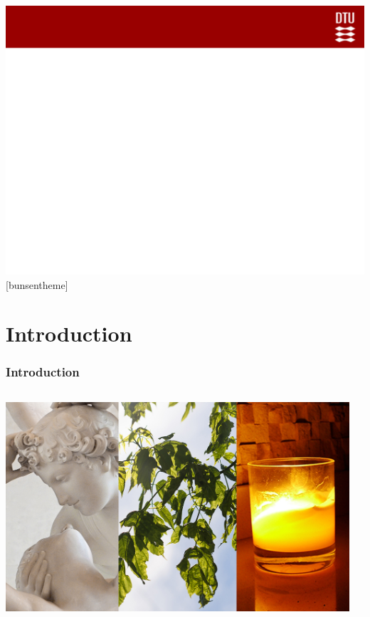 \documentclass{beamer}
\begin{document}
 {\includegraphics[width=\paperwidth,height=\paperheight]{slide_bg}}
[bunsentheme]

\section{Introduction}

\begin{frame}
    \frametitle{Introduction}
\begin{columns}[t]
    \begin{column}{\paperwidth}
      \centering
		\vspace{0.0cm}
		\includegraphics[width=\paperwidth]{comb}
\end{column}
​\end{columns}
\end{frame}
\end{document}

